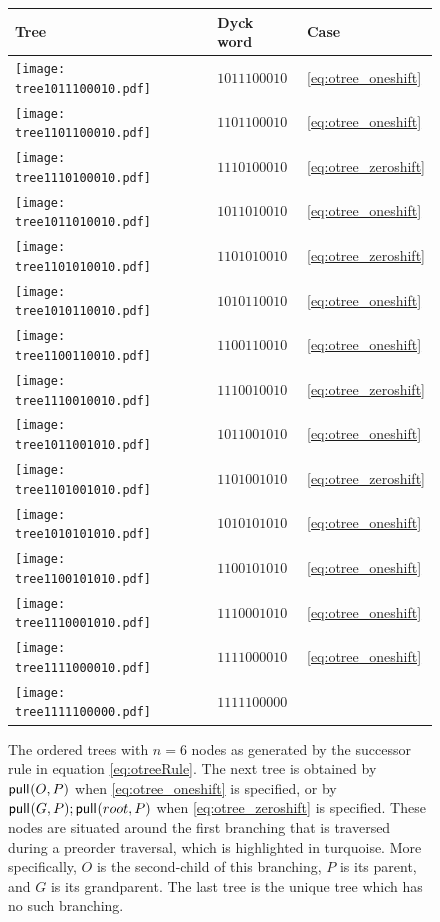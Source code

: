 \begin{figure}[ht]
\begin{minipage}[t]{0.335\linewidth}
\begin{tabular}{| m{2.3em} m{5em} m{} |} \hline
Tree & Dyck word & Case \\ \hline
\texttt{[image: tree1011100010.pdf]} & $1011100010$ & \eqref{eq:otree_oneshift}  \\ \hline
\texttt{[image: tree1101100010.pdf]} & $1101100010$ & \eqref{eq:otree_oneshift}  \\ \hline
\texttt{[image: tree1110100010.pdf]} & $1110100010$ & \eqref{eq:otree_zeroshift} \\ \hline
\texttt{[image: tree1011010010.pdf]} & $1011010010$ & \eqref{eq:otree_oneshift}  \\ \hline
\texttt{[image: tree1101010010.pdf]} & $1101010010$ & \eqref{eq:otree_zeroshift} \\ \hline
\texttt{[image: tree1010110010.pdf]} & $1010110010$ & \eqref{eq:otree_oneshift}  \\ \hline
\texttt{[image: tree1100110010.pdf]} & $1100110010$ & \eqref{eq:otree_oneshift}  \\ \hline
\texttt{[image: tree1110010010.pdf]} & $1110010010$ & \eqref{eq:otree_zeroshift} \\ \hline
\texttt{[image: tree1011001010.pdf]} & $1011001010$ & \eqref{eq:otree_oneshift}  \\ \hline
\texttt{[image: tree1101001010.pdf]} & $1101001010$ & \eqref{eq:otree_zeroshift} \\ \hline
\texttt{[image: tree1010101010.pdf]} & $1010101010$ & \eqref{eq:otree_oneshift}  \\ \hline
\texttt{[image: tree1100101010.pdf]} & $1100101010$ & \eqref{eq:otree_oneshift}  \\ \hline
\texttt{[image: tree1110001010.pdf]} & $1110001010$ & \eqref{eq:otree_oneshift}  \\ \hline
\texttt{[image: tree1111000010.pdf]} & $1111000010$ & \eqref{eq:otree_oneshift}  \\ \hline
\texttt{[image: tree1111100000.pdf]} & $1111100000$ &                            \\ \hline
\end{tabular}
\end{minipage}
    \caption[The ordered trees with $n = 6$ nodes as generated by the successor rule in equation \eqref{eq:otreeRule}.]{The ordered trees with $n = 6$ nodes as generated by the successor rule in equation \eqref{eq:otreeRule}.
    The next tree is obtained by $\mathsf{pull}_{}({O},{P})$ when \eqref{eq:otree_oneshift} is specified, or by $\mathsf{pull}_{}(G,P);\mathsf{pull}_{}({root},{P})$ when \eqref{eq:otree_zeroshift} is specified.
These nodes are situated around the first branching that is traversed during a preorder traversal, which is highlighted in turquoise.
More specifically, ${O}$ is the second-child of this branching, ${P}$ is its parent, and ${G}$ is its grandparent.
The last tree is the unique tree which has no such branching.}
\label{fig:trees6}
\end{figure}
